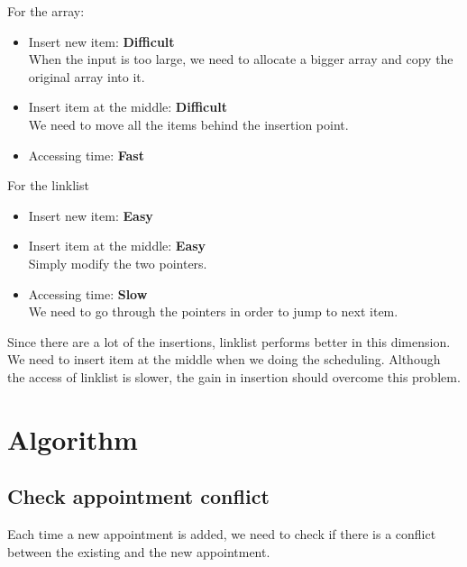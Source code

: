 \documentclass[10pt,a4paper]{article}
\begin{document}
For the array:
\begin{itemize}
\item Insert new item: \textbf{Difficult} \\ When the input is too large, we need to allocate a bigger array and copy the original array into it.
\item Insert item at the middle: \textbf{Difficult} \\ We need to move all the items behind the insertion point.
\item Accessing time: \textbf{Fast}
\end{itemize}

For the linklist
\begin{itemize}
\item Insert new item: \textbf{Easy}
\item Insert item at the middle: \textbf{Easy} \\ Simply modify the two pointers.
\item Accessing time: \textbf{Slow} \\ We need to go through the pointers in order to jump to next item.
\end{itemize}

Since there are a lot of the insertions, linklist performs better in this dimension. We need to insert item at the middle when we doing the scheduling. Although the access of linklist is slower, the gain in insertion should overcome this problem.
\section{Algorithm}
\subsection{Check appointment conflict}
\label{Algorithm:conflict}
Each time a new appointment is added, we need to check if there is a conflict between the existing and the new appointment.
\end{document}
